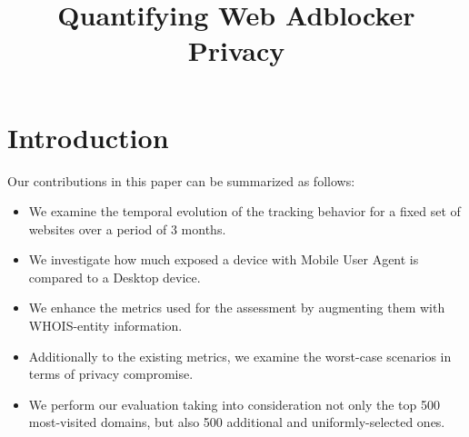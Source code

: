 \documentclass{sig-alternate}
\begin{document}
\title{Quantifying Web Adblocker Privacy}
\author{}


\maketitle

\begin{abstract}
\end{abstract}

\section{Introduction} \label{sec:introduction}

 Our contributions in this paper can be summarized as follows:
 \begin{itemize}
 \item We examine the temporal evolution of the tracking behavior for a fixed set of websites over a period of 3 months.
 \item We investigate how much exposed a device with Mobile User Agent is compared to a Desktop device.
 \item We enhance the metrics used for the assessment by augmenting them with WHOIS-entity information.
 \item Additionally to the existing metrics, we examine the worst-case scenarios in terms of privacy compromise.
 \item We perform our evaluation taking into consideration not only the top 500 most-visited domains, but also 500 additional and uniformly-selected ones.
 \end{itemize}
\end{document}
